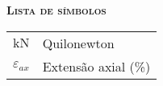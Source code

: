 
\vspace*{45pt}
\begin{flushleft}
	{\Large \textbf{\scshape{Lista de símbolos}}}
\end{flushleft}
\vspace*{20pt}

\begin{tabular}{l l}
    $\mathrm{kN}$       &   Quilonewton\\
    $\varepsilon_{ax}$  &   Extensão axial (\%)\\
\end{tabular}

